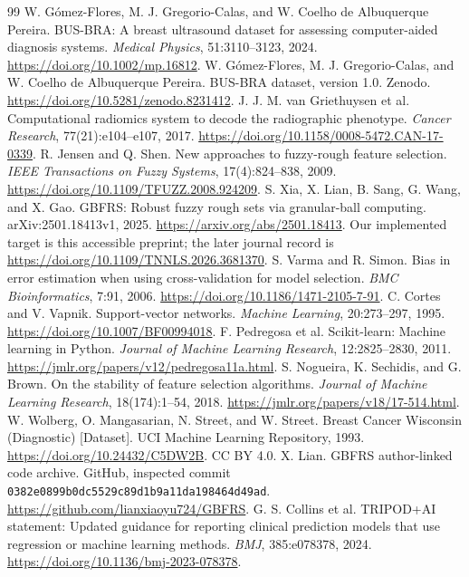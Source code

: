 \documentclass[11pt,a4paper]{article}
\begin{document}
\begin{thebibliography}{99}
 W. G\'omez-Flores, M. J. Gregorio-Calas, and W. Coelho de Albuquerque Pereira. BUS-BRA: A breast ultrasound dataset for assessing computer-aided diagnosis systems. \emph{Medical Physics}, 51:3110--3123, 2024. \url{https://doi.org/10.1002/mp.16812}.
 W. G\'omez-Flores, M. J. Gregorio-Calas, and W. Coelho de Albuquerque Pereira. BUS-BRA dataset, version 1.0. Zenodo. \url{https://doi.org/10.5281/zenodo.8231412}.
 J. J. M. van Griethuysen et al. Computational radiomics system to decode the radiographic phenotype. \emph{Cancer Research}, 77(21):e104--e107, 2017. \url{https://doi.org/10.1158/0008-5472.CAN-17-0339}.
 R. Jensen and Q. Shen. New approaches to fuzzy-rough feature selection. \emph{IEEE Transactions on Fuzzy Systems}, 17(4):824--838, 2009. \url{https://doi.org/10.1109/TFUZZ.2008.924209}.
 S. Xia, X. Lian, B. Sang, G. Wang, and X. Gao. GBFRS: Robust fuzzy rough sets via granular-ball computing. arXiv:2501.18413v1, 2025. \url{https://arxiv.org/abs/2501.18413}. Our implemented target is this accessible preprint; the later journal record is \url{https://doi.org/10.1109/TNNLS.2026.3681370}.
 S. Varma and R. Simon. Bias in error estimation when using cross-validation for model selection. \emph{BMC Bioinformatics}, 7:91, 2006. \url{https://doi.org/10.1186/1471-2105-7-91}.
 C. Cortes and V. Vapnik. Support-vector networks. \emph{Machine Learning}, 20:273--297, 1995. \url{https://doi.org/10.1007/BF00994018}.
 F. Pedregosa et al. Scikit-learn: Machine learning in Python. \emph{Journal of Machine Learning Research}, 12:2825--2830, 2011. \url{https://jmlr.org/papers/v12/pedregosa11a.html}.
 S. Nogueira, K. Sechidis, and G. Brown. On the stability of feature selection algorithms. \emph{Journal of Machine Learning Research}, 18(174):1--54, 2018. \url{https://jmlr.org/papers/v18/17-514.html}.
 W. Wolberg, O. Mangasarian, N. Street, and W. Street. Breast Cancer Wisconsin (Diagnostic) [Dataset]. UCI Machine Learning Repository, 1993. \url{https://doi.org/10.24432/C5DW2B}. CC BY 4.0.
 X. Lian. GBFRS author-linked code archive. GitHub, inspected commit \texttt{0382e0899b0dc5529c89d1b9a11da198464d49ad}. \url{https://github.com/lianxiaoyu724/GBFRS}.
 G. S. Collins et al. TRIPOD+AI statement: Updated guidance for reporting clinical prediction models that use regression or machine learning methods. \emph{BMJ}, 385:e078378, 2024. \url{https://doi.org/10.1136/bmj-2023-078378}.


\end{thebibliography}
\end{document}
